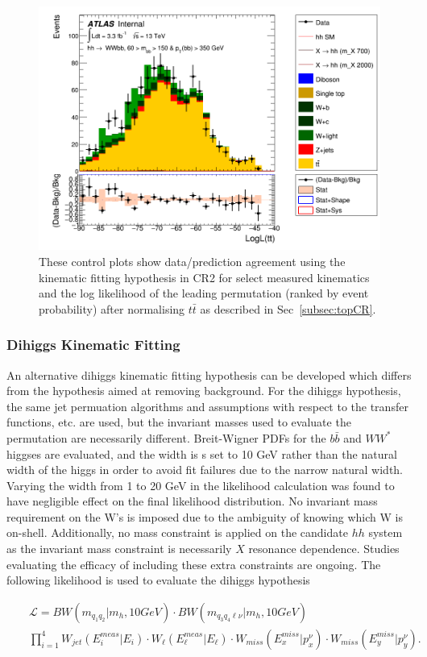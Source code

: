 \begin{figure}[!hb]
\begin{center}
                \includegraphics[width=.47\textwidth]{figures/kinFit_appendix/bbpt350_NF1190/C_mBBcr_opt2000_bbpt350_LogLikelihood_ttbar}
	\caption{These control plots show data/prediction agreement using the \ttbar kinematic fitting hypothesis in CR2 for select measured kinematics and the log likelihood of the leading permutation (ranked by event probability) after normalising $t\bar{t}$ as described in Sec~\ref{subsec:topCR}.}
	\label{fig:klfitter_control_plots_bbpt350_nf1190}
	\end{center}    
	\end{figure}	



\subsubsection{Dihiggs Kinematic Fitting} 
An alternative dihiggs kinematic fitting hypothesis can be developed which differs from the \ttbar hypothesis aimed at removing background. For the dihiggs hypothesis, the same jet permuation algorithms and assumptions with respect to the transfer functions, etc. are used, but the invariant masses used to evaluate the permutation are necessarily different. Breit-Wigner PDFs for the $b\bar{b}$ and $WW^*$ higgses are evaluated, and the width is s set to 10 GeV rather than the natural width of the higgs in order to avoid fit failures due to the narrow natural width. Varying the width from 1 to 20 GeV in the likelihood calculation was found to have negligible effect on the final likelihood distribution. No invariant mass requirement on the W's is imposed due to the ambiguity of knowing which W is on-shell. Additionally, no mass constraint is applied on the candidate $hh$ system as the invariant mass constraint is necessarily $X$ resonance dependence. Studies evaluating the efficacy of including these extra constraints are ongoing. The following likelihood is used to evaluate the dihiggs hypothesis


\begin{eqnarray}
&& \mathcal{L}=BW(m_{q_1q_2}| m_{h}, 10 GeV)\cdot BW(m_{q_3q_4\ell\nu}| m_{h}, 10 GeV) \nonumber \\
&& \prod\limits_{i=1}^4 W_{jet}(E_{i}^{meas}|E_{i})\cdot W_{\ell}(E_{\ell}^{meas}|E_{\ell})\cdot W_{miss}(E_{x}^{miss}|p_{x}^{\nu})\cdot W_{miss}(E_{y}^{miss}|p_{y}^{\nu}) .
\label{eq:KLF}
\end{eqnarray}

